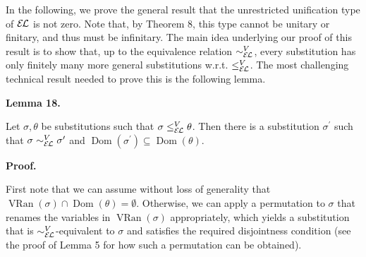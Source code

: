 \documentclass[10pt,a4paper]{amsart}
\begin{document}
 
 
In the following, we prove the general result that the unrestricted unification type of $\mathcal{E\mkern-1.618muL}$ is not zero. Note that, by Theorem 8, this type cannot be unitary or finitary, and thus must be infinitary. The main idea underlying our proof of this result is to show that, up to the equivalence relation $\sim_{\mathcal{E\mkern-1.618muL}}^{V}$, every substitution has only finitely many more general substitutions w.r.t. $\leq_{\mathcal{E\mkern-1.618muL}}^{V}$. The most challenging technical result needed to prove this is the following lemma.\par
 
 
 
\par\medskip\noindent\textbf{Lemma 18.}\par
 
 
Let $\sigma,\theta$ be substitutions such that $\sigma\leq_{\mathcal{E\mkern-1.618muL}}^{V}\theta$. Then there is a substitution $\sigma^{\prime}$ such that $\sigma\sim_{\mathcal{E\mkern-1.618muL}}^{V}\sigma^{\prime}$ and $\operatorname{Dom}(\sigma^{\prime})\subseteq\operatorname{Dom}(\theta)$.\par
 
 
 
 
 
\par\medskip\noindent\textbf{Proof.}\par
 
 
First note that we can assume without loss of generality that $\operatorname{VRan}(\sigma)\cap\operatorname{Dom}(\theta)=\emptyset$. Otherwise, we can apply a permutation to $\sigma$ that renames the variables in $\operatorname{VRan}(\sigma)$ appropriately, which yields a substitution that is $\sim_{\mathcal{E\mkern-1.618muL}}^{V}$-equivalent to $\sigma$ and satisfies the required disjointness condition (see the proof of Lemma 5 for how such a permutation can be obtained).\par
 
\end{document}
